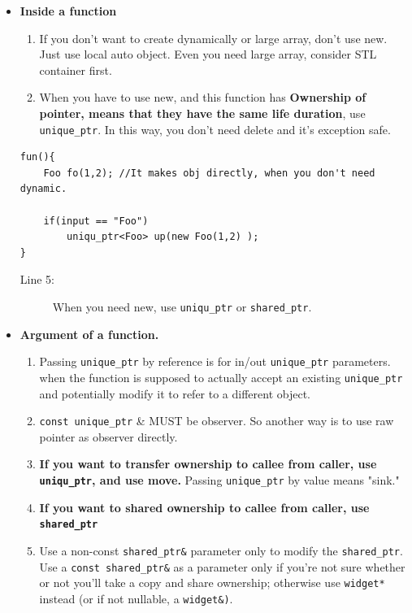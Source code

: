 \documentclass[a4paper,11pt,twoside]{book}
\begin{document}
\begin{itemize}

    \item \textbf{Inside a function}

\begin{enumerate}
    \item If you don't want to create dynamically or large array, don't use new. Just use local auto object. Even you need large array, consider STL container first.

    \item When you have to use new, and this function has \textbf{Ownership of pointer, means that they have the same life duration},  use \texttt{unique\_ptr}. In this way, you don't need delete and it's exception safe.
\end{enumerate}
\begin{lstlisting}
fun(){
	Foo fo(1,2); //It makes obj directly, when you don't need dynamic.
	
	if(input == "Foo")
		uniqu_ptr<Foo> up(new Foo(1,2) );
}
\end{lstlisting}
\begin{description}
	\item[Line 5:] When you need new, use \texttt{uniqu\_ptr} or \texttt{shared\_ptr}.
\end{description}


    \item \textbf{Argument of a function.}

\begin{enumerate}

    \item Passing \texttt{unique\_ptr} by reference is for in/out \texttt{unique\_ptr} parameters. when the function is supposed to actually accept an existing \texttt{unique\_ptr} and potentially modify it to refer to a different object. 

    \item \texttt{const unique\_ptr} \& MUST be observer. So another way is to use raw pointer as observer directly.

    \item \textbf{If you want to transfer ownership to callee from caller, use \texttt{uniqu\_ptr}, and use move.} Passing \texttt{unique\_ptr} by value means "sink."

    \item \textbf{If you want to shared ownership to callee from caller, use \texttt{shared\_ptr}}

    \item Use a non-const \texttt{shared\_ptr\&} parameter only to modify the \texttt{shared\_ptr}. Use a \texttt{const shared\_ptr\&} as a parameter only if you're not sure whether or not you'll take a copy and share ownership; otherwise use \texttt{widget*} instead (or if not nullable, a \texttt{widget\&)}.


\end{enumerate}
\end{itemize}
\end{document}
